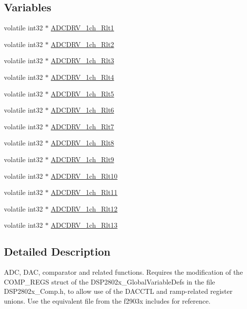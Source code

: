 \subsection*{Variables}
\begin{DoxyCompactItemize}
\item 
volatile int32 $\ast$ \hyperlink{a00006_a42ca9720519e1d0cb7ded4f56da083ba}{A\-D\-C\-D\-R\-V\-\_\-1ch\-\_\-\-Rlt1}
\item 
volatile int32 $\ast$ \hyperlink{a00006_a1ca55c7841c3e4bc154789647a068810}{A\-D\-C\-D\-R\-V\-\_\-1ch\-\_\-\-Rlt2}
\item 
volatile int32 $\ast$ \hyperlink{a00006_a1704632b071d0fff6bdc9629549c5d08}{A\-D\-C\-D\-R\-V\-\_\-1ch\-\_\-\-Rlt3}
\item 
volatile int32 $\ast$ \hyperlink{a00006_ac181cb2fb372cceb0f55844ed941c5d0}{A\-D\-C\-D\-R\-V\-\_\-1ch\-\_\-\-Rlt4}
\item 
volatile int32 $\ast$ \hyperlink{a00006_a7b586f409f6daf8232917fbd976532a4}{A\-D\-C\-D\-R\-V\-\_\-1ch\-\_\-\-Rlt5}
\item 
volatile int32 $\ast$ \hyperlink{a00006_ae8182c9b35af2d72b1c18ea41ccece2d}{A\-D\-C\-D\-R\-V\-\_\-1ch\-\_\-\-Rlt6}
\item 
volatile int32 $\ast$ \hyperlink{a00006_a4fa6265d0bf9b69d560d8f9f488b98c1}{A\-D\-C\-D\-R\-V\-\_\-1ch\-\_\-\-Rlt7}
\item 
volatile int32 $\ast$ \hyperlink{a00006_a0415309d16a115f0116a26aeda91aabd}{A\-D\-C\-D\-R\-V\-\_\-1ch\-\_\-\-Rlt8}
\item 
volatile int32 $\ast$ \hyperlink{a00006_adea6b0b8533e0d56a5c6cbac1c1e705f}{A\-D\-C\-D\-R\-V\-\_\-1ch\-\_\-\-Rlt9}
\item 
volatile int32 $\ast$ \hyperlink{a00006_ad1b851523cd317f0910f2db4220f32da}{A\-D\-C\-D\-R\-V\-\_\-1ch\-\_\-\-Rlt10}
\item 
volatile int32 $\ast$ \hyperlink{a00006_ad4435404e2f432a8c3a449dd23cda8f0}{A\-D\-C\-D\-R\-V\-\_\-1ch\-\_\-\-Rlt11}
\item 
volatile int32 $\ast$ \hyperlink{a00006_ac3656f047361723ec883e6ebfe3f026a}{A\-D\-C\-D\-R\-V\-\_\-1ch\-\_\-\-Rlt12}
\item 
volatile int32 $\ast$ \hyperlink{a00006_ad7ef0544a173d3c7883f0e739b7d2096}{A\-D\-C\-D\-R\-V\-\_\-1ch\-\_\-\-Rlt13}
\end{DoxyCompactItemize}


\subsection{Detailed Description}
A\-D\-C, D\-A\-C, comparator and related functions. Requires the modification of the C\-O\-M\-P\-\_\-\-R\-E\-G\-S struct of the D\-S\-P2802x\-\_\-\-Global\-Variable\-Defs in the file D\-S\-P2802x\-\_\-\-Comp.\-h, to allow use of the D\-A\-C\-C\-T\-L and ramp-\/related register unions. Use the equivalent file from the f2903x includes for reference. 

